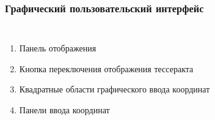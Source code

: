 \documentclass[10pt,pdf,hyperref={unicode}]{beamer}
\begin{document}
\begin{frame}
	\frametitle{Графический пользовательский интерфейс}
	\begin{columns}
			\begin{enumerate}
				\item Панель отображения
				\item Кнопка переключения отображения тессеракта
				\item Квадратные области графического ввода координат
				\item Панели ввода координат
			\end{enumerate}				
	\end{columns}
\end{frame}
\end{document}
